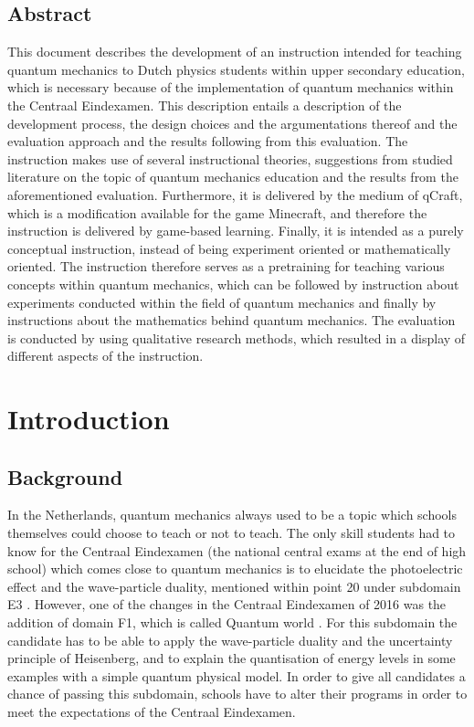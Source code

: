\documentclass[11pt,twoside]{report} %
\begin{document}
\section{Abstract}

This document describes the development of an instruction intended for teaching quantum mechanics to Dutch physics students within upper secondary education, which is necessary because of the implementation of quantum mechanics within the Centraal Eindexamen. This description entails a description of the development process, the design choices and the argumentations thereof and the evaluation approach and the results following from this evaluation. The instruction makes use of several instructional theories, suggestions from studied literature on the topic of quantum mechanics education and the results from the aforementioned evaluation. Furthermore, it is delivered by the medium of qCraft, which is a modification available for the game Minecraft, and therefore the instruction is delivered by game-based learning. Finally, it is intended as a purely conceptual instruction, instead of being experiment oriented or mathematically oriented. The instruction therefore serves as a pretraining for teaching various concepts within quantum mechanics, which can be followed by instruction about experiments conducted within the field of quantum mechanics and finally by instructions about the mathematics behind quantum mechanics. The evaluation is conducted by using qualitative research methods, which resulted in a display of different aspects of the instruction.

\chapter{Introduction}

\section{Background}

In the Netherlands, quantum mechanics always used to be a topic which schools themselves could choose to teach or not to teach. The only skill students had to know for the Centraal Eindexamen (the national central exams at the end of high school) which comes close to quantum mechanics is to elucidate the photoelectric effect and the wave-particle duality, mentioned within point 20 under subdomain E3 \cite{eindexamen2015}. However, one of the changes in the Centraal Eindexamen of 2016 was the addition of domain F1, which is called Quantum world \cite{eindexamen2016}. For this subdomain the candidate has to be able to apply the wave-particle duality and the uncertainty principle of Heisenberg, and to explain the quantisation of energy levels in some examples with a simple quantum physical model. In order to give all candidates a chance of passing this subdomain, schools have to alter their programs in order to meet the expectations of the Centraal Eindexamen.
\end{document}
